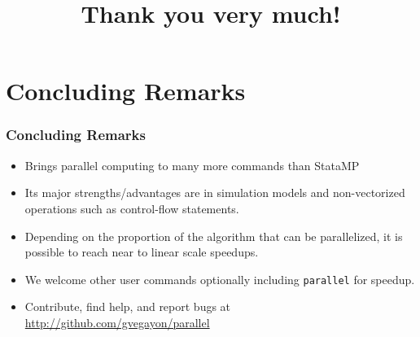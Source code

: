 \documentclass[9pt,\ExtraDocOpts]{beamer}
\begin{document}
\section{Concluding Remarks}

\begin{frame}
\frametitle{Concluding Remarks}

\begin{itemize}
\item Brings parallel computing to many more commands than StataMP \pause{}
\item Its major strengths/advantages are in simulation models and non-vectorized operations such as control-flow statements.\pause{}
\item Depending on the proportion of the algorithm that can be parallelized, it is possible to reach near to linear scale speedups.\pause{}
\item We welcome other user commands optionally including {\tt parallel} for speedup. \pause{}
\item Contribute, find help, and report bugs at \url{http://github.com/gvegayon/parallel}\pause{}

\end{itemize}

\end{frame}

\title{Thank you very much!}

\frame{\maketitle
}
\end{document}
